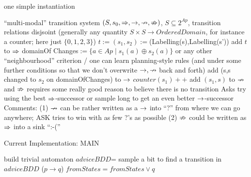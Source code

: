 \documentclass{article}
\begin{document}
\begin{algorithm}
	\caption{one simple instantiation}\label{alg:learn}
	\begin{algorithmic}[1]
		\Require ``multi-modal'' transition system $(S,s_0,\Rightarrow,\rightarrow,\nrightarrow,\nRightarrow)$, $S\subseteq 2^{Ap}$, transition relations disjsoint (generally any quantity $S\times S\to \mathit{OrderedDomain}$, for instance a counter; here just $\{0,1,2,3\}$)
		\State $t:=(s_1,s_2):=$(Labelling(s),Labelling(s'))
		\State add $t$ to $\Rightarrow$
		\State domainOf Changes$:=\{a\in Ap\mid s_1(a)\oplus s_2(a)\}$
		\State \Comment or any other ``neighbourhood'' criterion / one can learn planning-style rules
		\State \Comment(and under some further conditions so that we don't overwrite $\rightarrow,\nrightarrow$ back and forth)
		\State add (s,s changed to $s_2$ on domainOfChanges) to $\rightarrow$
		\EndFor
		\EndIf
		\State $counter(s_1)++$
		\State add $(s_1,s)$ to $\nrightarrow$
		\EndFor
		\EndIf
		\EndProcedure
		\State\Comment and $\nRightarrow$ requires some really good reason to believe there is no transition
		\Procedure Ask{s}
		\State try using the best $\Rightarrow$-successor or sample long to get an even better $\rightarrow$-successor
		\EndProcedure
		\newline
		\State Comments: 
		\State (1) $\nrightarrow$ can be rather written as a $\rightarrow$ into ``?'' from where we can go anywhere; ASK tries to win with as few ?'s as possible
		\State (2) $\nRightarrow$ could be written as $\Rightarrow$ into a sink ``:-(''
	\end{algorithmic}
\end{algorithm}



\begin{algorithm}
	\caption{Current Implementation: MAIN}\label{alg:current_main}
	\begin{algorithmic}[1]
		\State build trivial automaton
		\Repeat
		\State $adviceBDD$= 
		\State sample a bit to find a transition in $adviceBDD$ ($p \rightarrow q$)
		\State {}
		\State $fromStates = fromStates\vee q$
	\end{algorithmic}
\end{algorithm}
\end{document}

